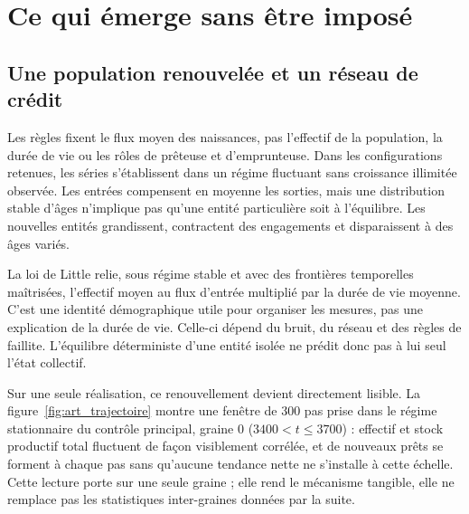 \section{Ce qui émerge sans être imposé}\label{sec:systeme}
\subsection{Une population renouvelée et un réseau de crédit}
Les règles fixent le flux moyen des naissances, pas l'effectif de la
population, la durée de vie ou les rôles de prêteuse et d'emprunteuse.
Dans les configurations retenues, les séries s'établissent dans un régime
fluctuant sans croissance illimitée observée. Les entrées compensent en
moyenne les sorties, mais une distribution stable d'âges n'implique pas
qu'une entité particulière soit à l'équilibre. Les nouvelles entités
grandissent, contractent des engagements et disparaissent à des âges variés.

La loi de Little relie, sous régime stable et avec des frontières temporelles
maîtrisées, l'effectif moyen au flux d'entrée multiplié par la durée de vie
moyenne. C'est une identité démographique utile pour organiser les mesures,
pas une explication de la durée de vie. Celle-ci dépend du bruit, du réseau
et des règles de faillite. L'équilibre déterministe d'une entité isolée
ne prédit donc pas à lui seul l'état collectif.

Sur une seule réalisation, ce renouvellement devient directement lisible.
La figure~\ref{fig:art_trajectoire} montre une fenêtre de 300 pas prise
dans le régime stationnaire du contrôle principal, graine 0
($3400<t\le3700$) : effectif et stock productif total fluctuent de façon
visiblement corrélée, et de nouveaux prêts se forment à chaque pas sans
qu'aucune tendance nette ne s'installe à cette échelle. Cette lecture
porte sur une seule graine ; elle rend le mécanisme tangible, elle ne
remplace pas les statistiques inter-graines données par la suite.


